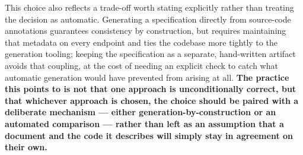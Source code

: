 This choice also reflects a trade-off worth stating explicitly rather than treating the decision as automatic. Generating a specification directly from source-code annotations guarantees consistency by construction, but requires maintaining that metadata on every endpoint and ties the codebase more tightly to the generation tooling; keeping the specification as a separate, hand-written artifact avoids that coupling, at the cost of needing an explicit check to catch what automatic generation would have prevented from arising at all. \textbf{The practice this points to is not that one approach is unconditionally correct, but that whichever approach is chosen, the choice should be paired with a deliberate mechanism --- either generation-by-construction or an automated comparison --- rather than left as an assumption that a document and the code it describes will simply stay in agreement on their own.}

